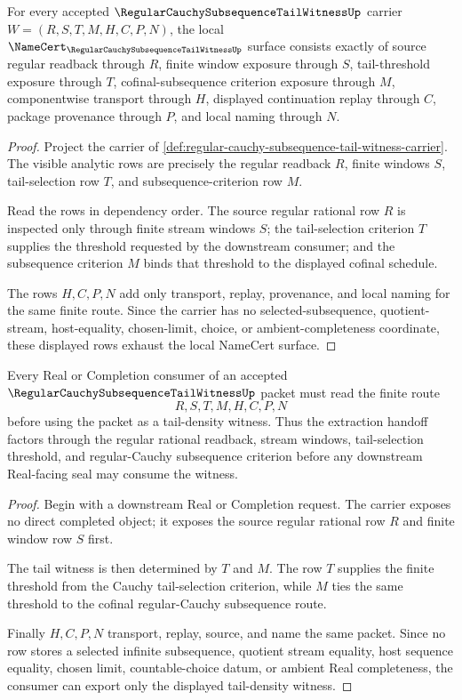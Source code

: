 \begin{theorem}
\label{thm:regular-cauchy-subsequence-tail-witness-namecert-obligations}
For every accepted $\RegularCauchySubsequenceTailWitnessUp$ carrier $W=(R,S,T,M,H,C,P,N)$, the local $\NameCert_{\RegularCauchySubsequenceTailWitnessUp}$ surface consists exactly of source regular readback through $R$, finite window exposure through $S$, tail-threshold exposure through $T$, cofinal-subsequence criterion exposure through $M$, componentwise transport through $H$, displayed continuation replay through $C$, package provenance through $P$, and local naming through $N$.
\end{theorem}
\begin{proof}
Project the carrier of \autoref{def:regular-cauchy-subsequence-tail-witness-carrier}. The visible analytic rows are precisely the regular readback $R$, finite windows $S$, tail-selection row $T$, and subsequence-criterion row $M$.

Read the rows in dependency order. The source regular rational row $R$ is inspected only through finite stream windows $S$; the tail-selection criterion $T$ supplies the threshold requested by the downstream consumer; and the subsequence criterion $M$ binds that threshold to the displayed cofinal schedule.

The rows $H,C,P,N$ add only transport, replay, provenance, and local naming for the same finite route. Since the carrier has no selected-subsequence, quotient-stream, host-equality, chosen-limit, choice, or ambient-completeness coordinate, these displayed rows exhaust the local NameCert surface.
\end{proof}

\begin{theorem}
\label{thm:regular-cauchy-subsequence-tail-witness-tail-extraction}
Every Real or Completion consumer of an accepted $\RegularCauchySubsequenceTailWitnessUp$ packet must read the finite route
$$
R,S,T,M,H,C,P,N
$$
before using the packet as a tail-density witness. Thus the extraction handoff factors through the regular rational readback, stream windows, tail-selection threshold, and regular-Cauchy subsequence criterion before any downstream Real-facing seal may consume the witness.
\end{theorem}
\begin{proof}
Begin with a downstream Real or Completion request. The carrier exposes no direct completed object; it exposes the source regular rational row $R$ and finite window row $S$ first.

The tail witness is then determined by $T$ and $M$. The row $T$ supplies the finite threshold from the Cauchy tail-selection criterion, while $M$ ties the same threshold to the cofinal regular-Cauchy subsequence route.

Finally $H,C,P,N$ transport, replay, source, and name the same packet. Since no row stores a selected infinite subsequence, quotient stream equality, host sequence equality, chosen limit, countable-choice datum, or ambient Real completeness, the consumer can export only the displayed tail-density witness.
\end{proof}

